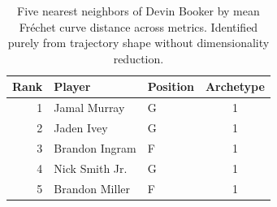 \begin{table}[htbp]
  \centering\small
  \begin{tabular}{rllc}
    \toprule
    Rank & Player & Position & Archetype \\
    \midrule
    1 & Jamal Murray & G & 1 \\
    2 & Jaden Ivey & G & 1 \\
    3 & Brandon Ingram & F & 1 \\
    4 & Nick Smith Jr. & G & 1 \\
    5 & Brandon Miller & F & 1 \\
    \bottomrule
  \end{tabular}
  \caption{Five nearest neighbors of Devin Booker by mean Fr\'{e}chet curve distance across metrics. Identified purely from trajectory shape without dimensionality reduction.}
  \label{tab:Devin_Booker_frechet_curve_neighbors}
\end{table}

